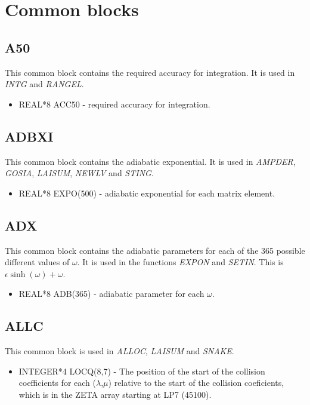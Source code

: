 \chapter{Common blocks}

\section{A50}

This common block contains the required accuracy for integration. It is used
in {\em INTG} and {\em RANGEL}.

\begin{itemize}
\item REAL*8 ACC50 - required accuracy for integration.
\end{itemize}

\section{ADBXI}

This common block contains the adiabatic exponential. It is used in {\em
AMPDER}, {\em GOSIA}, {\em LAISUM}, {\em NEWLV} and {\em STING}.

\begin{itemize}
\item REAL*8 EXPO(500) - adiabatic exponential for each matrix element.
\end{itemize}

\section{ADX}

This common block contains the adiabatic parameters for each of the 365
possible different values of $\omega$. It is used in the functions {\em
EXPON} and {\em SETIN}. This is $\epsilon \sinh(\omega) + \omega$.\\

\begin{itemize}
\item REAL*8 ADB(365) - adiabatic parameter for each $\omega$.
\end{itemize}

\section{ALLC}

This common block is used in {\em ALLOC}, {\em LAISUM} and {\em SNAKE}.

\begin{itemize}
\item INTEGER*4 LOCQ(8,7) - The position of the start of the collision
coefficients for each ($\lambda$,$\mu$) relative to the start of the
collision coeficients, which is in the ZETA array starting at LP7 (45100).
\end{itemize}

